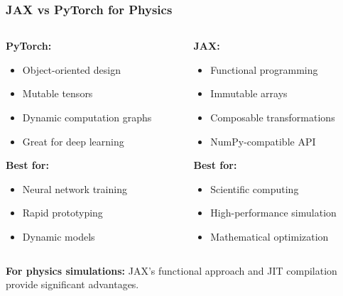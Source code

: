 \documentclass[notes]{beamer}
\begin{document}
\begin{frame}
\frametitle{JAX vs PyTorch for Physics}

\begin{columns}[T]
    \begin{column}{0.5\textwidth}
        \textbf{PyTorch:}
        \begin{itemize}
            \item Object-oriented design
            \item Mutable tensors
            \item Dynamic computation graphs
            \item Great for deep learning
        \end{itemize}
        
        \vspace{0.5cm}
        
        \textbf{Best for:}
        \begin{itemize}
            \item Neural network training
            \item Rapid prototyping
            \item Dynamic models
        \end{itemize}
    \end{column}
    \begin{column}{0.5\textwidth}
        \textbf{JAX:}
        \begin{itemize}
            \item Functional programming
            \item Immutable arrays
            \item Composable transformations
            \item NumPy-compatible API
        \end{itemize}
        
        \vspace{0.5cm}
        
        \textbf{Best for:}
        \begin{itemize}
            \item Scientific computing
            \item High-performance simulation
            \item Mathematical optimization
        \end{itemize}
    \end{column}
\end{columns}

\textbf{For physics simulations:} JAX's functional approach and JIT compilation provide significant advantages.

\end{frame}
\end{document}
